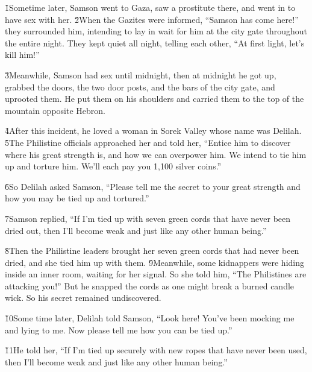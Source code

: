 \v{1}Sometime later, Samson went to Gaza, saw a prostitute there, and went in to have sex with her. \v{2}When the Gazites were informed, ``Samson has come here!'' they surrounded him, intending to lay in wait for him at the city gate throughout the entire night. They kept quiet all night, telling each other, ``At first light, let's kill him!''

\v{3}Meanwhile, Samson had sex until midnight, then at midnight he got up, grabbed the doors, the two door posts, and the bars of the city gate, and uprooted them. He put them on his shoulders and carried them to the top of the mountain opposite Hebron.

\v{4}After this incident, he loved a woman in Sorek Valley whose name was Delilah. \v{5}The Philistine officials approached her and told her, ``Entice him to discover where his great strength is, and how we can overpower him. We intend to tie him up and torture him. We'll each pay you 1,100 silver coins.''

\v{6}So Delilah asked Samson, ``Please tell me the secret to your great strength and how you may be tied up and tortured.''

\v{7}Samson replied, ``If I'm tied up with seven green cords that have never been dried out, then I'll become weak and just like any other human being.''

\v{8}Then the Philistine leaders brought her seven green cords that had never been dried, and she tied him up with them. \v{9}Meanwhile, some kidnappers were hiding inside an inner room, waiting for her signal. So she told him, ``The Philistines are attacking you!'' But he snapped the cords as one might break a burned candle wick. So his secret remained undiscovered.

\v{10}Some time later, Delilah told Samson, ``Look here! You've been mocking me and lying to me. Now please tell me how you can be tied up.''

\v{11}He told her, ``If I'm tied up securely with new ropes that have never been used, then I'll become weak and just like any other human being.''

